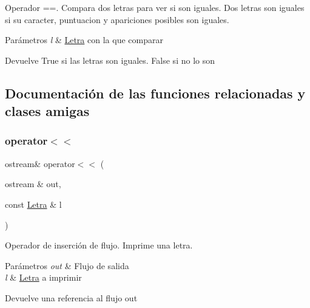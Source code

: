 Operador ==. Compara dos letras para ver si son iguales. Dos letras son iguales si su caracter, puntuacion y apariciones posibles son iguales. 


\begin{DoxyParams}{Parámetros}
{\em l} & \hyperlink{classLetra}{Letra} con la que comparar \\
\hline
\end{DoxyParams}
\begin{DoxyReturn}{Devuelve}
True si las letras son iguales. False si no lo son 
\end{DoxyReturn}


\subsection{Documentación de las funciones relacionadas y clases amigas}
\mbox{\label{classLetra_afdb7bfcba756230db41730558d5647ca}} 
\subsubsection{\texorpdfstring{operator$<$$<$}{operator<<}}
{\footnotesize\ttfamily ostream\& operator$<$$<$ (\begin{DoxyParamCaption}\item[{ostream \&}]{out,  }\item[{const \hyperlink{classLetra}{Letra} \&}]{l }\end{DoxyParamCaption})\hspace{0.3cm}{\ttfamily [friend]}}



Operador de inserción de flujo. Imprime una letra. 


\begin{DoxyParams}{Parámetros}
{\em out} & Flujo de salida \\
\hline
{\em l} & \hyperlink{classLetra}{Letra} a imprimir \\
\hline
\end{DoxyParams}
\begin{DoxyReturn}{Devuelve}
una referencia al flujo out 
\end{DoxyReturn}
\mbox{\label{classLetra_a98ae2f1699b9cc4ef8a9300fc0a2ffe9}} 

